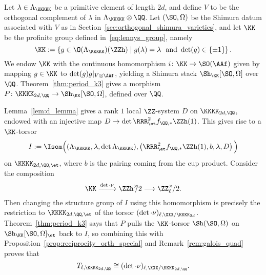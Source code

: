 

Let $\lambda \in \Lambda_{\KKKKK}$ be a primitive element of length $2d$, and define $V$ to be the orthogonal complement of $\lambda$ in $\Lambda_{\KKKKK} \otimes \QQ$. Let $(\SO,\Omega)$ be the Shimura datum associated with $V$ as in Section~\ref{sec:orthogonal_shimura_varieties}, and let $\KK$ be the profinite group defined in~\eqref{eq:lennys_group}, namely
$$
\KK := \left\{ g \in \O(\Lambda_{\KKKKK})(\ZZh) \mid g(\lambda) = \lambda\ \text{ and } \det(g) \in \{\pm 1\} \right\}.
$$
We endow $\KK$ with the continuous homomorphism $i\colon \KK \rightarrow \SO(\AAf)$ given by mapping $g \in \KK$ to $\det(g) g|_{V \otimes \AAf}$, yielding a Shimura stack $\Sh_{\KK}[\SO,\Omega]$ over $\QQ$. Theorem~\ref{thm:period_k3} gives a morphism $P\colon \KKKK_{2d,\QQ} \rightarrow \Sh_{\KK}[\SO,\Omega]$, defined over $\QQ$.

Lemma~\ref{lem:d_lemma} gives a rank $1$ local $\ZZ$-system $D$ on $\KKKK_{2d,\QQ}$, endowed with an injective map $D \rightarrow \det \RRR_{\et}^2 f_{\QQ,*} \ZZh(1)$. This gives rise to a $\KK$-torsor
$$
I := \Isom\Big((\Lambda_{\KKKKK},\lambda,\det\Lambda_{\KKKKK}),\left(\RRR^2_{\et} f_{\QQ,*}\ZZh(1),b,\lambda,D\right)\Big)
$$
on $\KKKK_{2d,\QQ,\et}$, where $b$ is the pairing coming from the cup product. Consider the composition
$$
\KK \xrightarrow{\det \cdot \nu} \ZZh^{\times}\hspace{-5pt}/2 \longrightarrow \ZZ_{\ell}^{\times}\!/2.
$$
Then changing the structure group of $I$ using this homomorphism is precisely the restriction to $\KKKK_{2d,\QQ,\et}$ of the torsor $(\det \cdot \nu)_{\ell,\XXX/\KKKK_{2d}}$. Theorem~\ref{thm:period_k3} says that $P$ pulls the $\KK$-torsor $\Sh(\SO,\Omega)$ on $\Sh_{\KK}[\SO,\Omega]_{\et}$ back to $I$, so combining this with Proposition~\ref{prop:reciprocity_orth_special} and Remark~\ref{rem:galois_quad} proves that 
\begin{equation}\label{eq:torsors_isom_Q}
    T_{\ell,\KKKK_{2d,\QQ}} \cong (\det \cdot \nu)_{\ell,\XXX/\KKKK_{2d,\QQ}}.
\end{equation}

